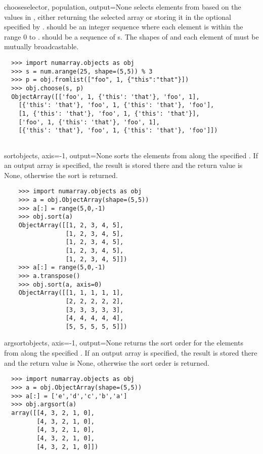 \begin{funcdesc}{choose}{selector, population, output=None}
  \label{func:obj.choose}
   selects elements from  based on the values in
  , either returning the selected array or storing it in the
  optional  specified by .   should
  be an integer sequence where each element is within the range 0 to
  .   should be a sequence of
  s. The shapes of  and each element of
   must be mutually broadcastable.
\begin{verbatim}
  >>> import numarray.objects as obj
  >>> s = num.arange(25, shape=(5,5)) % 3
  >>> p = obj.fromlist(["foo", 1, {"this":"that"}])
  >>> obj.choose(s, p)
  ObjectArray([['foo', 1, {'this': 'that'}, 'foo', 1],
    [{'this': 'that'}, 'foo', 1, {'this': 'that'}, 'foo'],
    [1, {'this': 'that'}, 'foo', 1, {'this': 'that'}],
    ['foo', 1, {'this': 'that'}, 'foo', 1],
    [{'this': 'that'}, 'foo', 1, {'this': 'that'}, 'foo']])
  
\end{verbatim}
\end{funcdesc}

\begin{funcdesc}{sort}{objects, axis=-1, output=None}
  \label{func:obj.sort}
   sorts the elements from  along the specified
  .  If an output array is specified, the result is stored there
  and the return value is None,  otherwise the sort is returned.
\begin{verbatim}
    >>> import numarray.objects as obj
    >>> a = obj.ObjectArray(shape=(5,5))
    >>> a[:] = range(5,0,-1)
    >>> obj.sort(a)
    ObjectArray([[1, 2, 3, 4, 5],
                 [1, 2, 3, 4, 5],
                 [1, 2, 3, 4, 5],
                 [1, 2, 3, 4, 5],
                 [1, 2, 3, 4, 5]])
    >>> a[:] = range(5,0,-1)
    >>> a.transpose()
    >>> obj.sort(a, axis=0)
    ObjectArray([[1, 1, 1, 1, 1],
                 [2, 2, 2, 2, 2],
                 [3, 3, 3, 3, 3],
                 [4, 4, 4, 4, 4],
                 [5, 5, 5, 5, 5]])
\end{verbatim}
\end{funcdesc}

\begin{funcdesc}{argsort}{objects, axis=-1, output=None}
  \label{func:obj.argsort}
   returns the sort order for the elements from 
  along the specified .  If an output array is specified, the result
  is stored there and the return value is None, otherwise the sort order is
  returned.
\begin{verbatim}
  >>> import numarray.objects as obj
  >>> a = obj.ObjectArray(shape=(5,5))
  >>> a[:] = ['e','d','c','b','a']
  >>> obj.argsort(a)
  array([[4, 3, 2, 1, 0],
         [4, 3, 2, 1, 0],
         [4, 3, 2, 1, 0],
         [4, 3, 2, 1, 0],
         [4, 3, 2, 1, 0]])
\end{verbatim}
\end{funcdesc}

